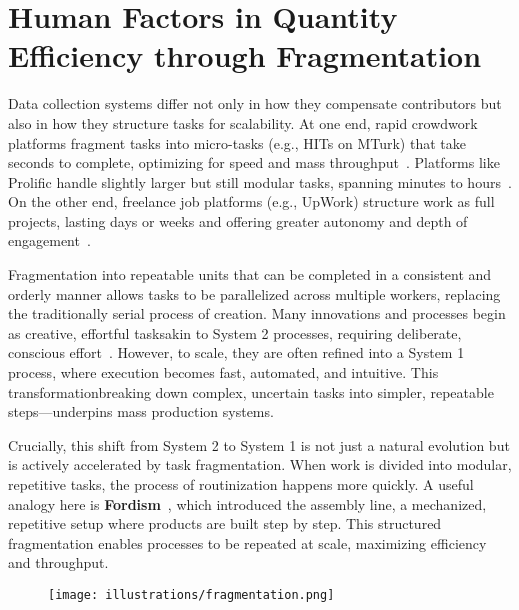 \section{Human Factors in Quantity\textemdash{}\\Efficiency through Fragmentation}
Data collection systems differ not only in how they compensate contributors but also in how they structure tasks for scalability. At one end, rapid crowdwork platforms fragment tasks into micro-tasks (e.g., HITs on MTurk) that take seconds to complete, optimizing for speed and mass throughput~\cite{malsburg2024mturk}. Platforms like Prolific handle slightly larger but still modular tasks, spanning minutes to hours~\cite{prolific2024completion}. On the other end, freelance job platforms (e.g., UpWork) structure work as full projects, lasting days or weeks and offering greater autonomy and depth of engagement~\cite{upwork2024times,fiverr2024comparison,workathomesmart2024lionbridge}.

Fragmentation into repeatable units that can be completed in a consistent and orderly manner allows tasks to be parallelized across multiple workers, replacing the traditionally serial process of creation. Many innovations and processes begin as creative, effortful tasks\textemdash{}akin to System 2 processes, requiring deliberate, conscious effort~\cite{kahneman2013prospect}. However, to scale, they are often refined into a System 1 process, where execution becomes fast, automated, and intuitive. This transformation\textemdash{}breaking down complex, uncertain tasks into simpler, repeatable steps—underpins mass production systems. 

Crucially, this shift from System 2 to System 1 is not just a natural evolution but is actively accelerated by task fragmentation. When work is divided into modular, repetitive tasks, the process of routinization happens more quickly.  A useful analogy here is \textbf{Fordism}~\cite{hounshell1984american}, which introduced the assembly line, a mechanized, repetitive setup where products are built step by step. This structured fragmentation enables processes to be repeated at scale, maximizing efficiency and throughput.

\begin{figure}[h]
    \centering
    \texttt{[image: illustrations/fragmentation.png]}
    \label{fig:fragmentation}
\end{figure}

